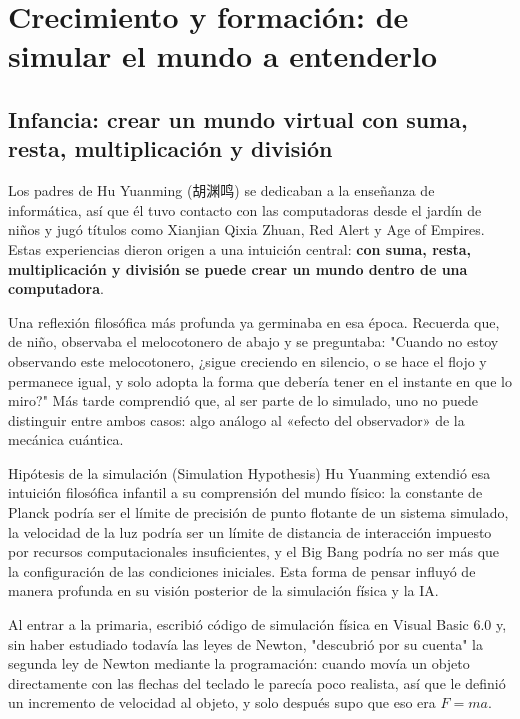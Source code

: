 \section{Crecimiento y formación: de simular el mundo a entenderlo}

\subsection{Infancia: crear un mundo virtual con suma, resta, multiplicación y división}

Los padres de Hu Yuanming (胡渊鸣) se dedicaban a la enseñanza de informática, así que él tuvo contacto con las computadoras desde el jardín de niños y jugó títulos como Xianjian Qixia Zhuan, Red Alert y Age of Empires. Estas experiencias dieron origen a una intuición central: \textbf{con suma, resta, multiplicación y división se puede crear un mundo dentro de una computadora}.

Una reflexión filosófica más profunda ya germinaba en esa época. Recuerda que, de niño, observaba el melocotonero de abajo y se preguntaba: "Cuando no estoy observando este melocotonero, ¿sigue creciendo en silencio, o se hace el flojo y permanece igual, y solo adopta la forma que debería tener en el instante en que lo miro?" Más tarde comprendió que, al ser parte de lo simulado, uno no puede distinguir entre ambos casos: algo análogo al «efecto del observador» de la mecánica cuántica.

\begin{knowledgebox}{Hipótesis de la simulación (Simulation Hypothesis)}
Hu Yuanming extendió esa intuición filosófica infantil a su comprensión del mundo físico: la constante de Planck podría ser el límite de precisión de punto flotante de un sistema simulado, la velocidad de la luz podría ser un límite de distancia de interacción impuesto por recursos computacionales insuficientes, y el Big Bang podría no ser más que la configuración de las condiciones iniciales. Esta forma de pensar influyó de manera profunda en su visión posterior de la simulación física y la IA.
\end{knowledgebox}

Al entrar a la primaria, escribió código de simulación física en Visual Basic 6.0 y, sin haber estudiado todavía las leyes de Newton, "descubrió por su cuenta" la segunda ley de Newton mediante la programación: cuando movía un objeto directamente con las flechas del teclado le parecía poco realista, así que le definió un incremento de velocidad al objeto, y solo después supo que eso era $F = ma$.

